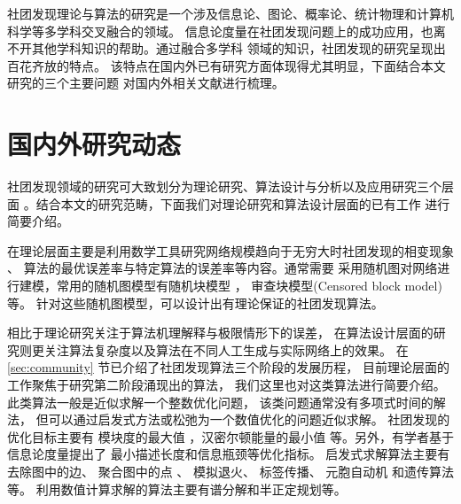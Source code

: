 社团发现理论与算法的研究是一个涉及信息论、图论、概率论、统计物理和计算机科学等多学科交叉融合的领域。
信息论度量在社团发现问题上的成功应用，也离不开其他学科知识的帮助。通过融合多学科
领域的知识，社团发现的研究呈现出百花齐放的特点。
该特点在国内外已有研究方面体现得尤其明显，下面结合本文研究的三个主要问题
对国内外相关文献进行梳理。

\section{国内外研究动态}

社团发现领域的研究可大致划分为理论研究、算法设计与分析以及应用研究三个层面
\cite{ZJSH201102017}。结合本文的研究范畴，下面我们对理论研究和算法设计层面的已有工作
进行简要介绍。


在理论层面主要是利用数学工具研究网络规模趋向于无穷大时社团发现的相变现象
\cite{lenka2016physics}、
算法的最优误差率与特定算法的误差率等内容。通常需要
采用随机图对网络进行建模，常用的随机图模型有随机块模型
\cite{holland1983stochastic}，
审查块模型(Censored block model) \cite{hajek2015censored}等。
针对这些随机图模型，可以设计出有理论保证的社团发现算法。%


相比于理论研究关注于算法机理解释与极限情形下的误差，
在算法设计层面的研究则更关注算法复杂度以及算法在不同人工生成与实际网络上的效果。
在 \ref{sec:community} 节已介绍了社团发现算法三个阶段的发展历程，
目前理论层面的工作聚焦于研究第二阶段涌现出的算法，
我们这里也对这类算法进行简要介绍。
此类算法一般是近似求解一个整数优化问题，
该类问题通常没有多项式时间的解法，
但可以通过启发式方法或松弛为一个数值优化的问题近似求解。
社团发现的优化目标主要有
模块度的最大值 \cite{newman2006modularity}，汉密尔顿能量的最小值
\cite{reichardt2004potts} 等。另外，有学者基于信息论度量提出了
最小描述长度\cite{rosvall2007information}和信息瓶颈\cite{ziv2005bottleneck}等优化指标。
启发式求解算法主要有
去除图中的边\cite{girvan2002community}、
聚合图中的点 \cite{clauset2004finding}、
模拟退火\cite{massen2005annealing}、
标签传播\cite{raghavan2007near}、
元胞自动机\cite{chen2008automata}
和遗传算法 \cite{pizzuti2008ga, zhu2009genetic}等。
利用数值计算求解的算法主要有谱分解\cite{coja-oghlan_2010}和半正定规划\cite{chen2012sdp}等。

